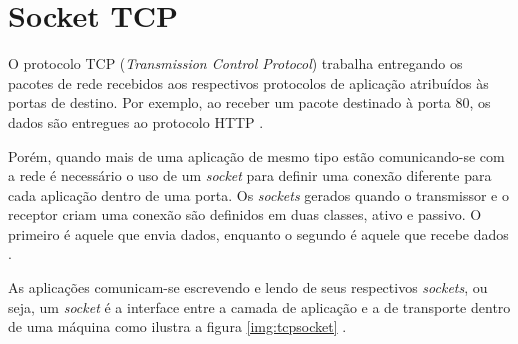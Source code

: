 \section{Socket TCP}
O protocolo TCP (\textit{Transmission Control Protocol}) trabalha entregando os pacotes de rede recebidos aos respectivos protocolos de aplicação atribuídos às portas de destino. Por exemplo, ao receber um pacote destinado à porta 80, os dados são entregues ao protocolo HTTP \cite{torres2001completo}.

Porém, quando mais de uma aplicação de mesmo tipo estão comunicando-se com a rede é necessário o uso de um \textit{socket} para definir uma conexão diferente para cada aplicação dentro de uma porta. Os \textit{sockets} gerados quando o transmissor e o receptor criam uma conexão são definidos em duas classes, ativo e passivo. O primeiro é aquele que envia dados, enquanto o segundo é aquele que recebe dados \cite{torres2001completo}.

As aplicações comunicam-se escrevendo e lendo de seus respectivos \textit{sockets}, ou seja, um \textit{socket} é a interface entre a camada de aplicação e a de transporte dentro de uma máquina como ilustra a figura \ref{img:tcpsocket} \cite{james2005redes}.

\newpage
{}